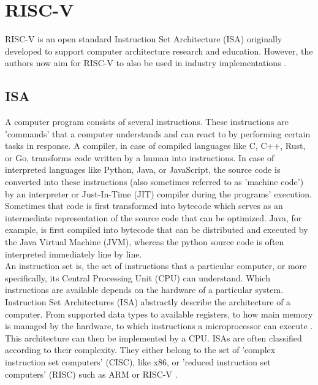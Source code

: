 
\section{RISC-V}

RISC-V \cite{riscv} is an open standard Instruction Set Architecture (ISA)
originally developed to support computer architecture research and education.
However, the authors now aim for RISC-V to also be used in industry implementations \cite[Cha 1]{riscv_spec}.

\subsection{ISA}

A computer program consists of several instructions.
These instructions are 'commands' that a computer understands and can react to by performing certain tasks in response.
A compiler, in case of compiled languages like C, C++, Rust, or Go, transforms code written by a human into instructions.
In case of interpreted languages like Python, Java, or JavaScript, the source code is converted into these instructions
(also sometimes referred to as 'machine code') by an interpreter or Just-In-Time (JIT) compiler during the programs' execution.
Sometimes that code is first transformed into bytecode which serves as an intermediate representation of the source code
that can be optimized.
Java, for example, is first compiled into bytecode that can be distributed and executed by the Java Virtual Machine (JVM),
whereas the python source code is often interpreted immediately line by line.
\\
An instruction set is, the set of instructions that a particular computer, or more specifically,
its Central Processing Unit (CPU) can understand.
Which instructions are available depends on the hardware of a particular system.
Instruction Set Architectures (ISA) abstractly describe the architecture of a computer.
From supported data types to available registers, to how main memory is managed by the hardware, to
which instructions a microprocessor can execute \cite{isa}.
This architecture can then be implemented by a CPU.
ISAs are often classified according to their complexity.
They either belong to the set of 'complex instruction set computers' (CISC), like x86,
or 'reduced instruction set computers' (RISC) such as ARM \cite{arm_architecture} or RISC-V \cite{riscv_spec}.

